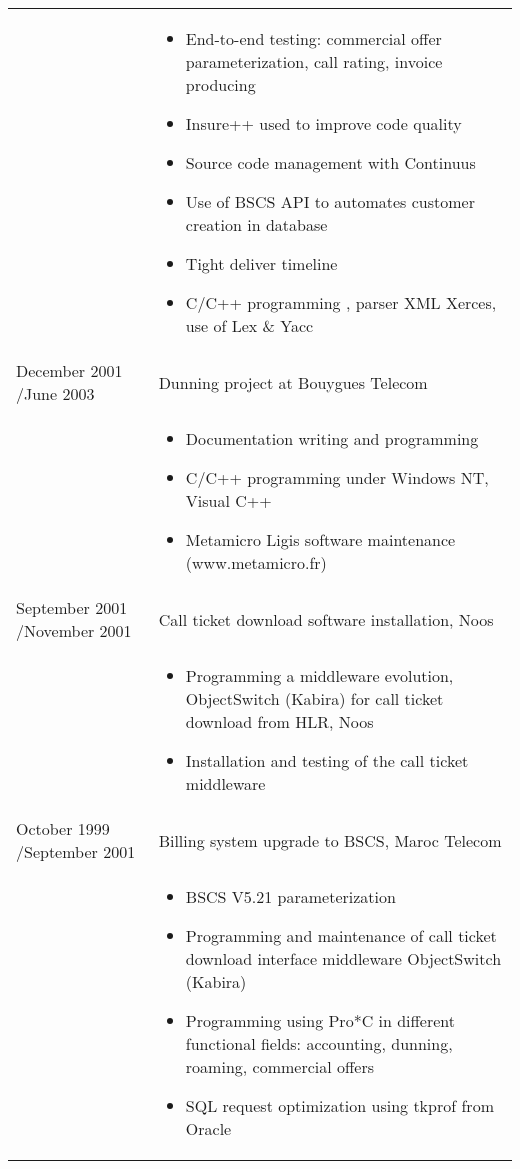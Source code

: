 \documentclass[a4paper,11pt]{letter}
\begin{document}
\begin{tabular}{p{}p{}}
& \begin{itemize}
\item     End-to-end testing: commercial offer parameterization, call rating, invoice producing
\item     Insure++ used to improve code quality
\item     Source code management with Continuus
\item     Use of BSCS API to automates customer creation in database
\item     Tight deliver timeline
\item     C/C++ programming , parser XML Xerces, use of Lex \& Yacc
\end{itemize} \\

	

December 2001 \slash June 2003 & Dunning project at Bouygues Telecom \\
	

& \begin{itemize}
\item     Documentation writing and programming 
\item     C/C++ programming under Windows NT, Visual C++
\item     Metamicro Ligis software maintenance (www.metamicro.fr)
\end{itemize} \\
	

September 2001 \slash November 2001 & Call ticket download software installation, Noos \\

& \begin{itemize}
\item     Programming a middleware evolution, ObjectSwitch (Kabira) for call ticket download from HLR, Noos
\item     Installation and  testing of the call ticket middleware 
\end{itemize} \\

	

October 1999 \slash September 2001 & Billing system upgrade to BSCS, Maroc Telecom \\
	

& \begin{itemize}
\item     BSCS V5.21 parameterization
\item     Programming and maintenance of call ticket download interface middleware ObjectSwitch (Kabira)
\item     Programming using Pro*C in different functional fields: accounting, dunning, roaming, commercial offers 
\item     SQL request optimization using tkprof from Oracle
\end{itemize} \\


\end{tabular}
\end{document}
